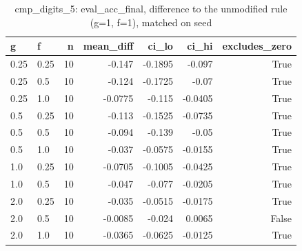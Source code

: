 \begin{table}[t]
\centering
\small
\begin{tabular}{llrrrrr}
\toprule
g & f & n & mean\_diff & ci\_lo & ci\_hi & excludes\_zero \\
\midrule
0.25 & 0.25 & 10 & -0.147 & -0.1895 & -0.097 & True \\
0.25 & 0.5 & 10 & -0.124 & -0.1725 & -0.07 & True \\
0.25 & 1.0 & 10 & -0.0775 & -0.115 & -0.0405 & True \\
0.5 & 0.25 & 10 & -0.113 & -0.1525 & -0.0735 & True \\
0.5 & 0.5 & 10 & -0.094 & -0.139 & -0.05 & True \\
0.5 & 1.0 & 10 & -0.037 & -0.0575 & -0.0155 & True \\
1.0 & 0.25 & 10 & -0.0705 & -0.1005 & -0.0425 & True \\
1.0 & 0.5 & 10 & -0.047 & -0.077 & -0.0205 & True \\
2.0 & 0.25 & 10 & -0.035 & -0.0515 & -0.0175 & True \\
2.0 & 0.5 & 10 & -0.0085 & -0.024 & 0.0065 & False \\
2.0 & 1.0 & 10 & -0.0365 & -0.0625 & -0.0125 & True \\
\bottomrule
\end{tabular}
\caption{cmp\_digits\_5: eval\_acc\_final, difference to the unmodified rule (g=1, f=1), matched on seed}
\label{tab:plasticity_cmp_digits_5_eval_acc_final_paired}
\end{table}